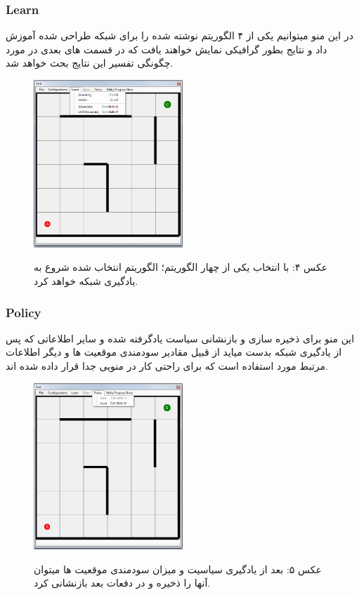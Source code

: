 \documentclass[10pt,a4paper]{article}
\begin{document}
\begin{Arabic}
    \subsubsection{Learn}
  در این منو میتوانیم یکی از ۴ الگوریتم نوشته شده را برای شبکه طراحی شده آموزش داد و نتایج بطور گرافیکی نمایش خواهند یافت که در قسمت های بعدی در مورد چگونگی تفسیر این نتایج بحث خواهد شد.
\begin{figure}[H]
    \centering
    \includegraphics[width=0.5\textwidth]{learn-menu}
    \begin{center}
    \textarabic{عکس ۴: با انتخاب یکی از چهار الگوریتم؛ الگوریتم انتخاب شده شروع به یادگیری شبکه خواهد کرد.}
    \end{center}
\end{figure}
    \subsubsection{Policy}
    این منو برای ذخیره سازی و بازنشانی سیاست یادگرفته شده و سایر اطلاعاتی که پس از یادگیری شبکه بدست میاید از قبیل مقادیر سودمندی موقعیت ها و دیگر اطلاعات مرتبط مورد استفاده است که برای راحتی کار در منویی جدا قرار داده شده اند.
\begin{figure}[H]
    \centering
    \includegraphics[width=0.5\textwidth]{policy-menu}
    \begin{center}
    \textarabic{عکس ۵: بعد از یادگیری سیاسیت و میزان سودمندی موقعیت ها میتوان آنها را ذخیره و در دفعات بعد بازنشانی کرد.}
    \end{center}
\end{figure}

\end{Arabic}
\end{document}
